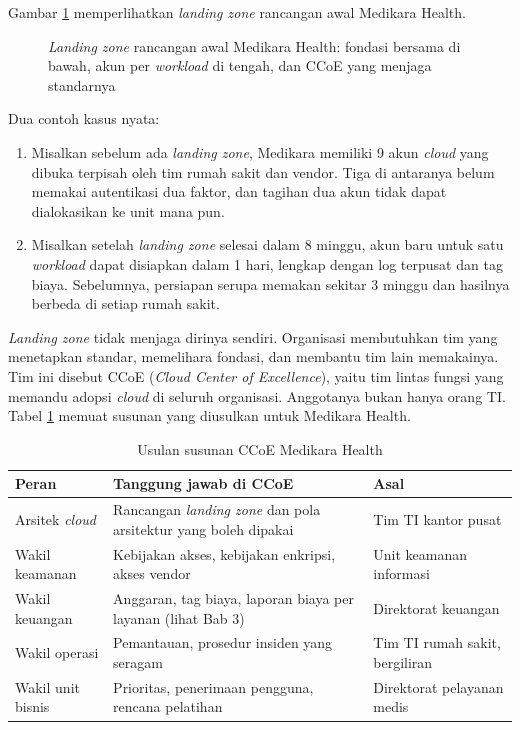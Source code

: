 Gambar \ref{fig:ch04-landing-zone} memperlihatkan \textit{landing zone} rancangan awal
Medikara Health.

\begin{figure}[!htb]
  \centering
  
  \caption{\textit{Landing zone} rancangan awal Medikara Health: fondasi bersama di bawah,
           akun per \textit{workload} di tengah, dan CCoE yang menjaga standarnya}
  \label{fig:ch04-landing-zone}
\end{figure}

Dua contoh kasus nyata:
\begin{enumerate}
  \item Misalkan sebelum ada \textit{landing zone}, Medikara memiliki 9 akun \textit{cloud}
        yang dibuka terpisah oleh tim rumah sakit dan vendor. Tiga di antaranya belum
        memakai autentikasi dua faktor, dan tagihan dua akun tidak dapat dialokasikan ke
        unit mana pun.
  \item Misalkan setelah \textit{landing zone} selesai dalam 8 minggu, akun baru untuk
        satu \textit{workload} dapat disiapkan dalam 1 hari, lengkap dengan log terpusat
        dan tag biaya. Sebelumnya, persiapan serupa memakan sekitar 3 minggu dan hasilnya
        berbeda di setiap rumah sakit.
\end{enumerate}

\textit{Landing zone} tidak menjaga dirinya sendiri. Organisasi membutuhkan tim yang
menetapkan standar, memelihara fondasi, dan membantu tim lain memakainya. Tim ini disebut
CCoE (\textit{Cloud Center of Excellence}), yaitu tim lintas fungsi yang memandu adopsi
\textit{cloud} di seluruh organisasi. Anggotanya bukan hanya orang TI. Tabel
\ref{tab:ch04-peran-ccoe} memuat susunan yang diusulkan untuk Medikara Health.

\begin{table}[!htb]
  \centering
  \footnotesize
  \caption{Usulan susunan CCoE Medikara Health}
  \label{tab:ch04-peran-ccoe}
  \begin{tabularx}{\textwidth}{>{\raggedright\arraybackslash}p{2.5cm}
                               >{\raggedright\arraybackslash}X
                               >{\raggedright\arraybackslash}p{3.2cm}}
    \hline
    \textbf{Peran} & \textbf{Tanggung jawab di CCoE} & \textbf{Asal} \\
    \hline
    Arsitek \textit{cloud} & Rancangan \textit{landing zone} dan pola arsitektur yang
      boleh dipakai & Tim TI kantor pusat \\
    \hline
    Wakil keamanan & Kebijakan akses, kebijakan enkripsi, akses vendor & Unit keamanan
      informasi \\
    \hline
    Wakil keuangan & Anggaran, tag biaya, laporan biaya per layanan (lihat Bab 3) &
      Direktorat keuangan \\
    \hline
    Wakil operasi & Pemantauan, prosedur insiden yang seragam & Tim TI rumah sakit,
      bergiliran \\
    \hline
    Wakil unit bisnis & Prioritas, penerimaan pengguna, rencana pelatihan & Direktorat
      pelayanan medis \\
    \hline
  \end{tabularx}
\end{table}

